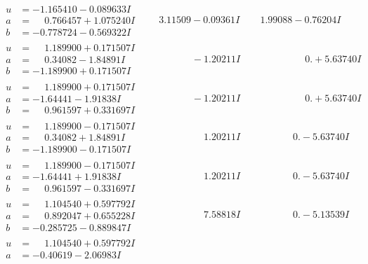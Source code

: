 \documentclass[1p]{elsarticle_modified}
\theoremstyle{definition}
\begin{document}
$$\begin{array}{c|c|c}
\begin{aligned}
u &= -1.165410 - 0.089633 I \\
a &= \phantom{-}0.766457 + 1.075240 I \\
b &= -0.778724 - 0.569322 I\end{aligned}
 & \phantom{-}3.11509 - 0.09361 I & \phantom{-}1.99088 - 0.76204 I \\ \hline\begin{aligned}
u &= \phantom{-}1.189900 + 0.171507 I \\
a &= \phantom{-}0.34082 - 1.84891 I \\
b &= -1.189900 + 0.171507 I\end{aligned}
 & \phantom{-0.000000 } -1.20211 I & \phantom{-0.000000 -}0. + 5.63740 I \\ \hline\begin{aligned}
u &= \phantom{-}1.189900 + 0.171507 I \\
a &= -1.64441 - 1.91838 I \\
b &= \phantom{-}0.961597 + 0.331697 I\end{aligned}
 & \phantom{-0.000000 } -1.20211 I & \phantom{-0.000000 -}0. + 5.63740 I \\ \hline\begin{aligned}
u &= \phantom{-}1.189900 - 0.171507 I \\
a &= \phantom{-}0.34082 + 1.84891 I \\
b &= -1.189900 - 0.171507 I\end{aligned}
 & \phantom{-0.000000 -}1.20211 I & \phantom{-0.000000 } 0. - 5.63740 I \\ \hline\begin{aligned}
u &= \phantom{-}1.189900 - 0.171507 I \\
a &= -1.64441 + 1.91838 I \\
b &= \phantom{-}0.961597 - 0.331697 I\end{aligned}
 & \phantom{-0.000000 -}1.20211 I & \phantom{-0.000000 } 0. - 5.63740 I \\ \hline\begin{aligned}
u &= \phantom{-}1.104540 + 0.597792 I \\
a &= \phantom{-}0.892047 + 0.655228 I \\
b &= -0.285725 - 0.889847 I\end{aligned}
 & \phantom{-0.000000 -}7.58818 I & \phantom{-0.000000 } 0. - 5.13539 I \\ \hline\begin{aligned}
u &= \phantom{-}1.104540 + 0.597792 I \\
a &= -0.40619 - 2.06983 I \\

\end{aligned}
\end{array}$$
\end{document}
